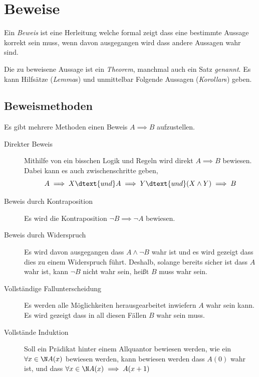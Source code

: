 \documentclass{article}
\begin{document}
\section{Beweise} 
Ein \emph{Beweis} ist eine Herleitung welche formal zeigt dass eine bestimmte Aussage korrekt sein muss, wenn davon ausgegangen wird dass andere Aussagen wahr sind.

Die zu beweisene Aussage ist ein \emph{Theorem}, manchmal auch ein Satz \emph{genannt}. Es kann Hilfsätze (\emph{Lemma}s) und unmittelbar Folgende Aussagen (\emph{Korollar}s) geben.

\subsection{Beweismethoden}
Es gibt mehrere Methoden einen Beweis $A \implies B$ aufzustellen.

\begin{description}
 \item[Direkter Beweis] Mithilfe von ein bisschen Logik und Regeln wird direkt $A \implies B$ bewiesen. Dabei kann es auch zwischenschritte geben, \zb
\[
 A \implies X
 \dtext{und}
 A \implies Y
 \dtext{und}
 (X \land Y) \implies B
\]
 \item[Beweis durch Kontraposition] Es wird die Kontraposition $\lnot B \implies \lnot A$ bewiesen. 
 \item[Beweis durch Widerspruch] Es wird davon ausgegangen dass $A \land \lnot B$ wahr ist und es wird gezeigt dass dies zu einem Widerspruch führt. Deshalb, solange bereits sicher ist dass $A$ wahr ist, kann $\lnot B$ nicht wahr sein, heißt $B$ muss wahr sein.
 \item[Vollständige Fallunterscheidung] Es werden alle Möglichkeiten herausgearbeitet inwiefern $A$ wahr sein kann. Es wird gezeigt dass in all diesen Fällen $B$ wahr sein muss.
 \item[Vollstände Induktion] Soll ein Prädikat hinter einem Allquantor bewiesen werden, wie ein $\forall x \in \N A(x)$ bewiesen werden, kann bewiesen werden dass $A(0)$ wahr ist, und dass $\forall x \in \N A(x) \implies A(x+1)$
\end{description}
\end{document}
